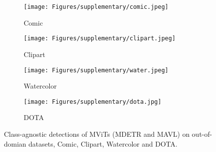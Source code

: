 \documentclass[runningheads]{llncs}
\begin{document}
\begin{figure*}[!ht]
  \centering
  \begin{subfigure}{.5\columnwidth}
    \centering
    \texttt{[image: Figures/supplementary/comic.jpeg]}
    \caption{Comic \cite{clipart-comic-water}}
    \label{c}
  \end{subfigure}\begin{subfigure}{.5\columnwidth}
    \centering
    \texttt{[image: Figures/supplementary/clipart.jpeg]}
    \caption{Clipart \cite{clipart-comic-water}}
    \label{d}
  \end{subfigure}\hfill
 \begin{subfigure}{.5\columnwidth}
    \centering
    \texttt{[image: Figures/supplementary/water.jpeg]}
    \caption{Watercolor \cite{clipart-comic-water}}
    \label{e}
  \end{subfigure}\begin{subfigure}{.5\columnwidth}
    \centering
    \texttt{[image: Figures/supplementary/dota.jpg]}
    \caption{DOTA \cite{dota}}
    \label{f}
  \end{subfigure}\hfill
  \caption{Class-agnostic detections of MViTs (MDETR \cite{mdetr} and MAVL) on out-of-domian datasets, Comic, Clipart, Watercolor and DOTA.}
  \label{figure:class_agnostic2}
\end{figure*}
  
\end{document}
